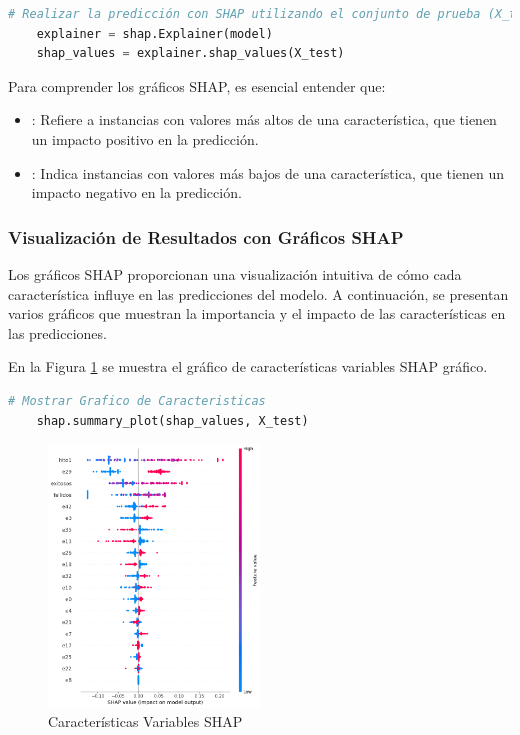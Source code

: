 \begin{lstlisting}[language=Python, caption=Predicción con SHAP utilizando el conjunto de prueba, label=lst:shap_analysis]
    # Realizar la predicción con SHAP utilizando el conjunto de prueba (X_test)
    explainer = shap.Explainer(model)
    shap_values = explainer.shap_values(X_test)
\end{lstlisting}


Para comprender los gráficos SHAP, es esencial entender que:

\begin{itemize}
    \item {}: Refiere a instancias con valores más altos de una característica, que tienen un impacto positivo en la predicción.
    \item {}: Indica instancias con valores más bajos de una característica, que tienen un impacto negativo en la predicción.
\end{itemize}

\subsubsection{Visualización de Resultados con Gráficos SHAP}

Los gráficos SHAP proporcionan una visualización intuitiva de cómo cada característica influye en las predicciones del modelo. A continuación, se presentan varios gráficos que muestran la importancia y el impacto de las características en las predicciones.

En la Figura \ref{fig:caract_var_shap} se muestra el gráfico de características variables SHAP gráfico.

\begin{lstlisting}[language=Python, caption=Grafico de Caracteristicas, label=lst:graf_caracteristicas]
    # Mostrar Grafico de Caracteristicas
    shap.summary_plot(shap_values, X_test)
\end{lstlisting}

\begin{figure}[H]
    \centering
    \includegraphics[width=0.5\textwidth]{img/shap_rf/shapForcePlot2.png}
    \caption{Características Variables SHAP}
    \label{fig:caract_var_shap}
\end{figure}


